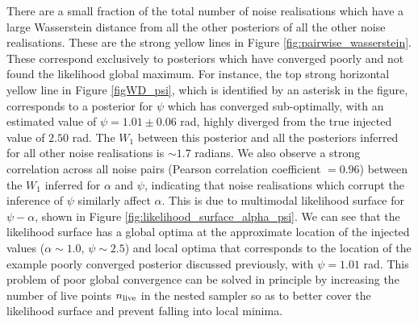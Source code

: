 \documentclass[fleqn,usenatbib,useAMS]{mnras}
\providecommand{\DIFadd}[1]{{\protect\color{blue}\uwave{#1}}} %
\providecommand{\DIFaddbegin}{} %
\providecommand{\DIFaddend}{} %
\newcommand{\DIFaddincludegraphics}[2][]{{\color{blue}\fbox{\DIFOincludegraphics[#1]{#2}}}} %
\DeclareRobustCommand{\DIFaddbegin}{\DIFOaddbegin \let\includegraphics\DIFaddincludegraphics} %
\DeclareRobustCommand{\DIFaddend}{\DIFOaddend \let\includegraphics\DIFOincludegraphics} %
\begin{document}
There are a small fraction of the total number of noise realisations which have a large Wasserstein distance from all the other posteriors of all the other noise realisations. These are the strong yellow lines in Figure \ref{fig:pairwise_wasserstein}. These correspond exclusively to posteriors which have converged poorly and not found the likelihood global maximum. For instance, the top strong horizontal yellow line in Figure \ref{figWD_psi}, which is identified by an asterisk in the figure, corresponds to a posterior for $\psi$ which has converged sub-optimally, with an estimated value of $\psi = 1.01 \pm 0.06$ rad, highly diverged from the true injected value of $2.50$ rad. The $W_1$ \DIFaddbegin \DIFadd{value }\DIFaddend between this posterior and all the posteriors inferred for all other noise realisations is $\sim 1.7$ radians. We also observe a strong correlation across all noise pairs (Pearson correlation coefficient $=0.96$) between the $W_1$ inferred for $\alpha$ and $\psi$, indicating that noise realisations which corrupt the inference of $\psi$ similarly affect $\alpha$. This is due to multimodal likelihood surface for $\psi-\alpha$, shown in Figure \ref{fig:likelihood_surface_alpha_psi}. We can see that the likelihood surface has a global optima at the approximate location of the injected values ($\alpha \sim 1.0$, $\psi\sim2.5$) and local optima that corresponds to the location of the example poorly converged posterior discussed previously, with $\psi = 1.01$ rad. This problem of poor global convergence can be solved in principle by increasing the number of live points $n_{\rm live}$ in the nested sampler so as to better cover the likelihood surface and prevent falling into local minima. 
\end{document}
